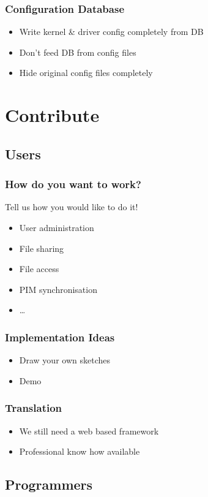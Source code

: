 \documentclass[handout]{beamer}
\begin{document}
\begin{frame}
\frametitle{Configuration Database}
\begin{itemize}[<+->]
  \item Write kernel \& driver config completely from DB
  \item Don't feed DB from config files
  \item Hide original config files completely
\end{itemize}
\end{frame}

\section{Contribute}

\subsection{Users}

\begin{frame}
\frametitle{How do you want to work?}
Tell us how you would like to do it!
\begin{itemize}[<+->]
  \item User administration
  \item File sharing
  \item File access
  \item PIM synchronisation
  \item \ldots
\end{itemize}
\end{frame}

\begin{frame}
\frametitle{Implementation Ideas}
\begin{itemize}[<+->]
  \item Draw your own sketches
  \item Demo
\end{itemize}
\end{frame}

\begin{frame}
\frametitle{Translation}
\begin{itemize}[<+->]
  \item We still need a web based framework
  \item Professional know how available
\end{itemize}
\end{frame}

\subsection{Programmers}
\end{document}

